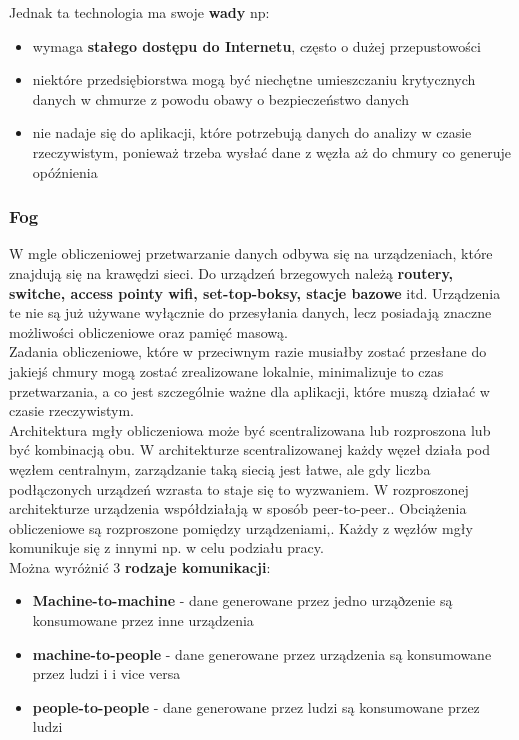 Jednak ta technologia ma swoje \textbf{wady} np:

\begin{itemize}
	\item wymaga \textbf{stałego dostępu do Internetu}, często o dużej przepustowości
	\item niektóre przedsiębiorstwa mogą być niechętne umieszczaniu krytycznych danych w chmurze z powodu obawy o bezpieczeństwo danych
	\item nie nadaje się do aplikacji, które potrzebują danych do analizy w czasie rzeczywistym, ponieważ trzeba wysłać dane z węzła aż do chmury co generuje opóźnienia \\
\end{itemize}

\subsubsection{Fog}

W mgle obliczeniowej przetwarzanie danych odbywa się na urządzeniach, które znajdują się na krawędzi sieci. Do urządzeń brzegowych należą \textbf{routery, switche, access pointy wifi,  set-top-boksy, stacje bazowe} itd. Urządzenia te nie są już używane wyłącznie do przesyłania danych, lecz posiadają znaczne możliwości obliczeniowe oraz pamięć masową. \\

Zadania obliczeniowe, które w przeciwnym razie musiałby zostać przesłane do jakiejś chmury mogą zostać zrealizowane lokalnie, minimalizuje to czas przetwarzania, a co jest szczególnie ważne dla aplikacji, które muszą działać w czasie rzeczywistym. \\

Architektura mgły obliczeniowa może być scentralizowana lub rozproszona lub być kombinacją obu. W architekturze scentralizowanej każdy węzeł działa pod węzłem centralnym, zarządzanie taką siecią jest łatwe, ale gdy liczba podłączonych urządzeń wzrasta to staje się to wyzwaniem. W rozproszonej architekturze urządzenia współdziałają w sposób peer-to-peer.. Obciążenia obliczeniowe są rozproszone pomiędzy urządzeniami,. Każdy z węzłów mgły komunikuje się z innymi np. w celu podziału pracy. \\

Można wyróżnić 3 \textbf{rodzaje komunikacji}:

\begin{itemize}
	\item \textbf{Machine-to-machine} - dane generowane przez jedno urząðzenie są konsumowane przez inne urządzenia
	\item \textbf{machine-to-people} - dane generowane przez urządzenia są konsumowane przez ludzi i i vice versa
	\item \textbf{people-to-people} - dane generowane przez ludzi są konsumowane przez ludzi \\
\end{itemize}

